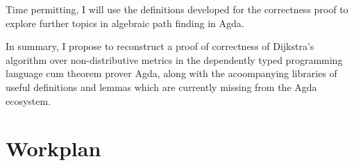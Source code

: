 \documentclass[a4paper]{scrartcl}
\begin{document}
Time permitting, I will use the definitions developed for the correctness proof to explore further topics in algebraic path finding in Agda.

In summary, I propose to reconstruct a proof of correctness of Dijkstra's algorithm over non-distributive metrics in the dependently typed programming language cum theorem prover Agda, along with the acoompanying libraries of useful definitions and lemmas which are currently missing from the Agda ecosystem.

\section{Workplan%
  \label{workplan}%
}

\printbibliography
\end{document}
